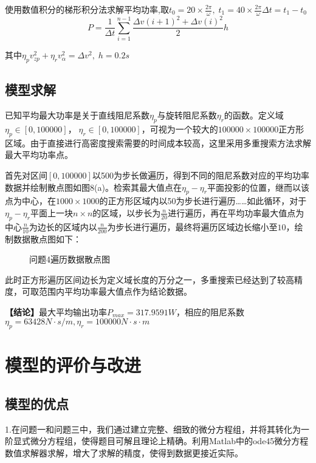 \documentclass{article}
\numberwithin{equation}{subsection}
\begin{document}
使用数值积分的梯形积分法求解平均功率,取$t_0=20 \times \frac{2 \pi}{\omega}, \; t_{1}=40 \times \frac{2 \pi}{\omega}\Delta t=t_1-t_0$
\begin{equation}
P=\frac{1}{\Delta t}\sum\limits_{i=1}^{n-1}\frac{\Delta v(i+1)^2+\Delta v(i)^2}{2}h
\end{equation}

其中$\eta_p v_{zp}^2+\eta_r v_{\alpha}^2=\Delta v^2,\;h=0.2s$
\subsection{模型求解}


已知平均最大功率是关于直线阻尼系数$\eta _p$与旋转阻尼系数$\eta _r$的函数。定义域$\eta_p \in [0,100000]$，$\;\eta _r\in [0,100000]$，可视为一个较大的$100000\times 100000$正方形区域。由于直接进行高密度搜索需要的时间成本较高，这里采用多重搜索方法求解最大平均功率点。

首先对区间$[0,100000]$以500为步长做遍历，得到不同的阻尼系数对应的平均功率数据并绘制散点图如图8(a)。检索其最大值点在$\eta_p-\eta_r$平面投影的位置，继而以该点为中心，在$1000\times1000$的正方形区域内以50为步长进行遍历……如此循环，对于$\eta_p-\eta_r$平面上一块$n\times n$的区域，以步长为$\frac{n}{20}$进行遍历，再在平均功率最大值点为中心$\frac{n}{10}$为边长的区域内以$\frac{n}{200}$为步长进行遍历，最终将遍历区域边长缩小至$10$，绘制数据散点图如下：

\begin{figure}[htbp]
    \centering
    \quad
    \caption{问题4遍历数据散点图}
\end{figure}
此时正方形遍历区间边长为定义域长度的万分之一，多重搜索已经达到了较高精度，可取范围内平均功率最大值点作为结论数据。

\textbf{【结论】}最大平均输出功率$P_{max}=317.9591W$，相应的阻尼系数$\eta_p=63428N·s/m,\eta _r=100000N·s·m$


{\centering\section{模型的评价与改进}}
\subsection{模型的优点}
1.在问题一和问题三中，我们通过建立完整、细致的微分方程组，并将其转化为一阶显式微分方程组，使得题目可解且理论上精确。利用Matlab中的ode45微分方程数值求解器求解，增大了求解的精度，使得到数据更接近实际。
\end{document}
